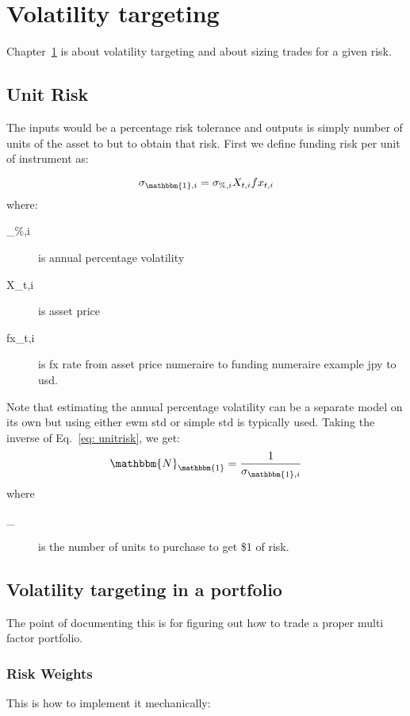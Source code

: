 
\chapter{Volatility targeting}
\label{ch:voltgt}

Chapter~\ref{ch:voltgt} is about volatility targeting and about sizing trades for a given risk. 


\section{Unit Risk}
\label{sn: unitrisk}
The inputs would be a percentage risk tolerance and outputs is simply number of units of the asset to but to obtain that risk. First we define funding risk per unit of instrument as:

\begin{equation}
\label{eq: unitrisk}
\sigma_{\mathbbm{1},i} = \sigma_{\%,i}X_{t,i}fx_{t,i}
\end{equation}
where:
\begin{description}
\item[\sigma_{\%,i}] is annual percentage volatility
\item[X_{t,i}] is asset price
\item[fx_{t,i}] is fx rate from asset price numeraire to funding numeraire example jpy to usd.
\end{description}
Note that estimating the annual percentage volatility can be a separate model on its own but using either ewm std or simple std is typically used. Taking the inverse of Eq.~\ref{eq: unitrisk}, we get:
\begin{equation}
\mathbbm{N}_{\mathbbm{1}} = \frac{1}{\sigma_{\mathbbm{1},i}}
\end{equation}
where
\begin{description}
\item[_{}] is the number of units to purchase to get \$1 of risk.
\end{description}

\section{Volatility targeting in a portfolio}
\label{sn: pfvoltgt}
The point of documenting this is for figuring out how to trade a proper multi factor portfolio.

\subsection{Risk Weights}
\label{ssn: riskweights}
This is how to implement it mechanically:


